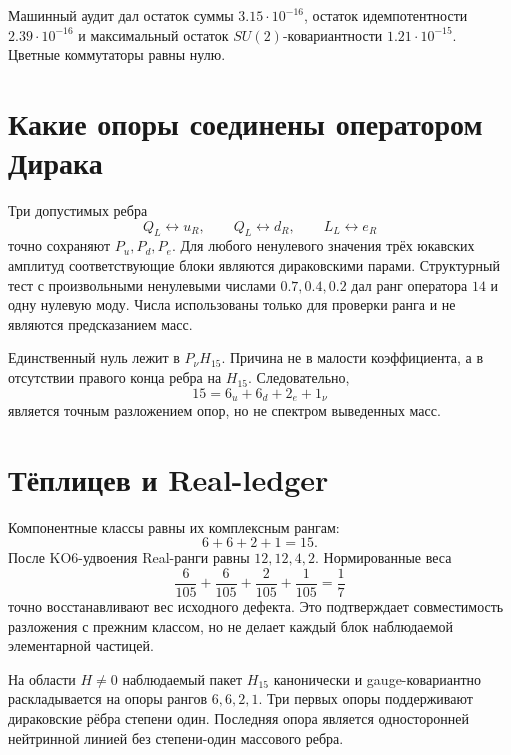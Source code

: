 Машинный аудит дал остаток суммы $3.15\cdot10^{-16}$,
остаток идемпотентности $2.39\cdot10^{-16}$ и максимальный остаток
$SU(2)$-ковариантности $1.21\cdot10^{-15}$. Цветные коммутаторы равны
нулю.

\section{Какие опоры соединены оператором Дирака}

Три допустимых ребра
\begin{equation}
 Q_L\leftrightarrow u_R,
 \qquad Q_L\leftrightarrow d_R,
 \qquad L_L\leftrightarrow e_R
\end{equation}
точно сохраняют $P_u,P_d,P_e$. Для любого ненулевого значения трёх
юкавских амплитуд соответствующие блоки являются дираковскими парами.
Структурный тест с произвольными ненулевыми числами $0.7,0.4,0.2$ дал
ранг оператора $14$ и одну нулевую моду. Числа использованы только для
проверки ранга и не являются предсказанием масс.

Единственный нуль лежит в $P_\nu H_{15}$. Причина не в малости
коэффициента, а в отсутствии правого конца ребра на $H_{15}$.
Следовательно,
\begin{equation}
 15=6_u+6_d+2_e+1_\nu
\end{equation}
является точным разложением опор, но не спектром выведенных масс.

\section{Тёплицев и Real-ledger}

Компонентные классы равны их комплексным рангам:
\begin{equation}
 6+6+2+1=15.
\end{equation}
После KO6-удвоения Real-ранги равны $12,12,4,2$. Нормированные веса
\begin{equation}
 \frac6{105}+\frac6{105}+\frac2{105}+\frac1{105}=\frac17
\end{equation}
точно восстанавливают вес исходного дефекта. Это подтверждает
совместимость разложения с прежним классом, но не делает каждый блок
наблюдаемой элементарной частицей.

\begin{theorem}
На области $H\ne0$ наблюдаемый пакет $H_{15}$ канонически и
gauge-ковариантно раскладывается на опоры рангов $6,6,2,1$.
Три первых опоры поддерживают дираковские рёбра степени один. Последняя
опора является односторонней нейтринной линией без степени-один массового
ребра.
\end{theorem}

